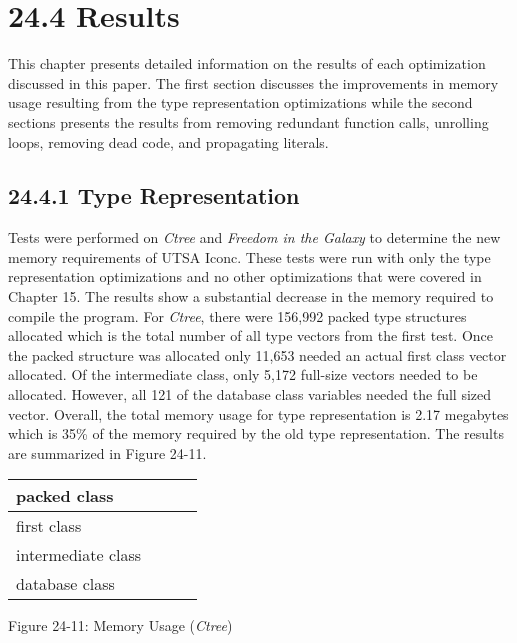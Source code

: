 \section[24.4 Results]{24.4 Results}

This chapter presents detailed information on the results of each
optimization discussed in this paper. The first section discusses the
improvements in memory usage resulting from the type representation
optimizations while the second sections presents the results from
removing redundant function calls, unrolling loops, removing dead
code, and propagating literals.

\subsection[24.4.1 Type Representation]{24.4.1 Type Representation}

Tests were performed on \textit{Ctree} and \textit{Freedom in the
Galaxy} to determine the new memory requirements of UTSA Iconc. These
tests were run with only the type representation optimizations and no
other optimizations that were covered in Chapter 15. The results show a
substantial decrease in the memory required to compile the
program. For \textit{Ctree}, there were 156,992 packed type structures
allocated which is the total number of all type vectors from the first
test. Once the packed structure was allocated only 11,653 needed an
actual first class vector allocated.  Of the intermediate class, only
5,172 full-size vectors needed to be allocated. However, all 121 of
the database class variables needed the full sized vector. Overall,
the total memory usage for type representation is 2.17 megabytes which
is 35\% of the memory required by the old type representation. The
results are summarized in Figure 24-11.

\begin{center}
\tabletail{}
\tablelasttail{}
\begin{xtabular}{|m{1.2163599in}|m{1.1969599in}|m{1.2538599in}|m{1.6636599in}|}
\hline
 packed class &
 &
 &
\raggedleft{}\\\hline
 first class &
 &
 &
\raggedleft{}\\\hline
 intermediate class &
 &
 &
\raggedleft{}\\\hline
 database class &
 &
 &
\raggedleft{}\\\hline
\end{xtabular}
\end{center}
{\centering{}
Figure 24-11: Memory Usage (\textit{Ctree})
\par}


